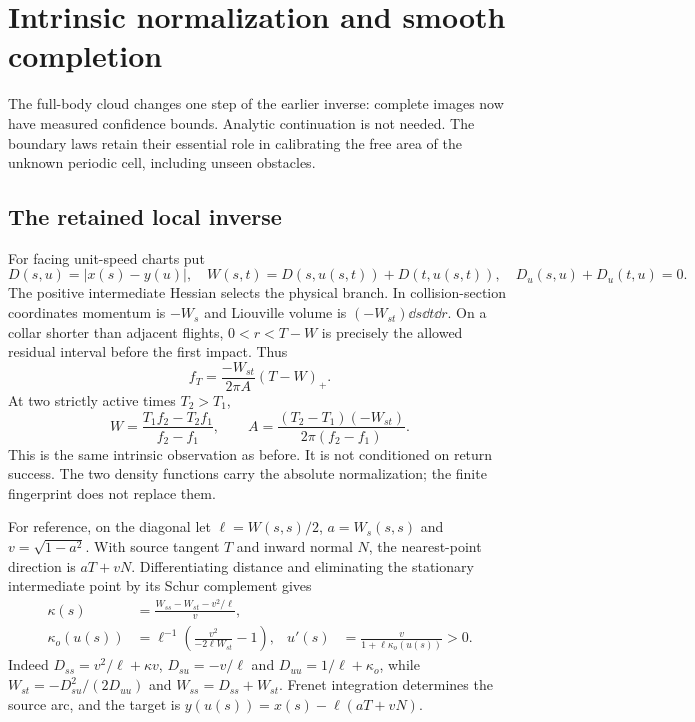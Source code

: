 \section{Intrinsic normalization and smooth completion}\label{sec:certificate}
The full-body cloud changes one step of the earlier inverse: complete
images now have measured confidence bounds. Analytic continuation is not
needed. The boundary laws retain their essential role in calibrating the
free area of the unknown periodic cell, including unseen obstacles.

\subsection{The retained local inverse}
For facing unit-speed charts put
\[
 D(s,u)=|x(s)-y(u)|,\quad
 W(s,t)=D(s,u(s,t))+D(t,u(s,t)),\quad D_u(s,u)+D_u(t,u)=0.
\]
The positive intermediate Hessian selects the physical branch. In
collision-section coordinates momentum is $-W_s$ and Liouville volume is
$(-W_{st})\dd s\dd t\dd r$. On a collar shorter than adjacent flights,
$0<r<T-W$ is precisely the allowed residual interval before the first
impact. Thus
\begin{equation}\label{eq:law}
 f_T=\frac{-W_{st}}{2\pi A}(T-W)_+.
\end{equation}
At two strictly active times $T_2>T_1$,
\begin{equation}\label{eq:action-area}
 W=\frac{T_1f_2-T_2f_1}{f_2-f_1},\qquad
 A=\frac{(T_2-T_1)(-W_{st})}{2\pi(f_2-f_1)}.
\end{equation}
This is the same intrinsic observation as before. It is not conditioned
on return success. The two density functions carry the absolute
normalization; the finite fingerprint does not replace them.

For reference, on the diagonal let
$\ell=W(s,s)/2$, $a=W_s(s,s)$ and $v=\sqrt{1-a^2}$. With source tangent
$T$ and inward normal $N$, the nearest-point direction is $aT+vN$.
Differentiating distance and eliminating the stationary intermediate point
by its Schur complement gives
\begin{align}
 \kappa(s)&=\frac{W_{ss}-W_{st}-v^2/\ell}{v},\label{eq:curvature}\\
 \kappa_o(u(s))&=\ell^{-1}\left(\frac{v^2}{-2\ell W_{st}}-1\right),
 &u'(s)&=\frac{v}{1+\ell\kappa_o(u(s))}>0.\label{eq:foot}
\end{align}
Indeed $D_{ss}=v^2/\ell+\kappa v$, $D_{su}=-v/\ell$ and
$D_{uu}=1/\ell+\kappa_o$, while
$W_{st}=-D_{su}^2/(2D_{uu})$ and $W_{ss}=D_{ss}+W_{st}$.
Frenet integration determines the source arc, and the target is
$y(u(s))=x(s)-\ell(aT+vN)$.


